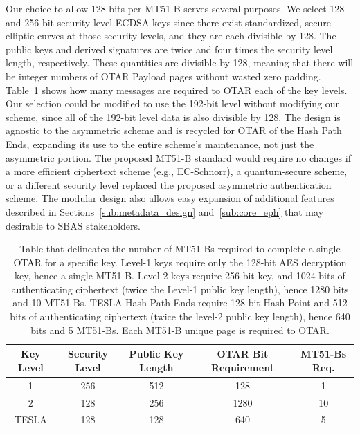 \documentclass[letterpaper,times]{IONconf/IONconf}
\begin{document}
	Our choice to allow 128-bits per MT51-B serves several purposes.
	We select 128 and 256-bit security level ECDSA keys since there exist standardized, secure elliptic curves at those security levels, and they are each divisible by 128.
	The public keys and derived signatures are twice and four times the security level length, respectively.
	These quantities are divisible by 128, meaning that there will be integer numbers of OTAR Payload pages without wasted zero padding.
	Table~\ref{tab: ciphertext lengths} shows how many messages are required to OTAR each of the key levels.
	Our selection could be modified to use the 192-bit level without modifying our scheme, since all of the 192-bit level data is also divisible by 128.
	The design is agnostic to the asymmetric scheme and is recycled for OTAR of the Hash Path Ends, expanding its use to the entire scheme's maintenance, not just the asymmetric portion.
	The proposed MT51-B standard would require no changes if a more efficient ciphertext scheme (e.g., EC-Schnorr), a quantum-secure scheme, or a different security level replaced the proposed asymmetric authentication scheme.
	The modular design also allows easy expansion of additional features described in Sections~\ref{sub:metadata_design} and~\ref{sub:core_eph} that may desirable to SBAS stakeholders.
		\begin{table}[H]
		\center
		\begin{tabular}{|c|c|c|c|c|} \hline
			Key Level & Security Level & Public Key Length & OTAR Bit Requirement & MT51-Bs Req. \\ \hline
			    1 & 256 & 512 &  128 & 1 \\ \hline
			    2 & 128 & 256 & 1280 & 10\\ \hline
			TESLA & 128 & 128 &  640 & 5 \\ \hline
		\end{tabular}
		\caption{Table that delineates the number of MT51-Bs required to complete a single OTAR for a specific key. Level-1 keys require only the 128-bit AES decryption key, hence a single MT51-B. Level-2 keys require 256-bit key, and 1024 bits of authenticating ciphertext (twice the Level-1 public key length), hence 1280 bits and 10 MT51-Bs. TESLA Hash Path Ends require 128-bit Hash Point and 512 bits of authenticating ciphertext (twice the level-2 public key length), hence 640 bits and 5 MT51-Bs. Each MT51-B unique page is required to OTAR.}
		\label{tab: ciphertext lengths}
	\end{table}
\end{document}
